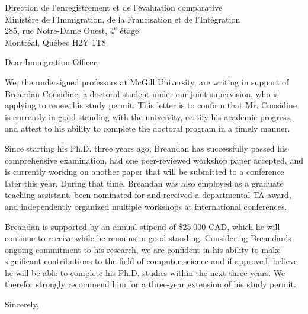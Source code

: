 \documentclass{letter}
\begin{document}
    \begin{letter}{Direction de l'enregistrement et de l'\'evaluation comparative\\
    Minist\`ere de l'Immigration, de la Francisation et de l'Int\'egration\\
    285, rue Notre-Dame Ouest, $4^\text{e}$ \'etage\\
    Montr\'eal, Qu\'ebec H2Y 1T8}
        \opening{Dear Immigration Officer,}
\vspace{10pt}
        We, the undersigned professors at McGill University, are writing in support of Breandan Considine, a doctoral student under our joint supervision, who is applying to renew his study permit. This letter is to confirm that Mr. Considine is currently in good standing with the university, certify his academic progress, and attest to his ability to complete the doctoral program in a timely manner.

        Since starting his Ph.D. three years ago, Breandan has successfully passed his comprehensive examination, had one peer-reviewed workshop paper accepted, and is currently working on another paper that will be submitted to a conference later this year. During that time, Breandan was also employed as a graduate teaching assistant, been nominated for and received a departmental TA award, and independently organized multiple workshops at international conferences.

        Breandan is supported by an annual stipend of \$25,000 CAD, which he will continue to receive while he remains in good standing. Considering Breandan's ongoing commitment to his research, we are confident in his ability to make significant contributions to the field of computer science and if approved, believe he will be able to complete his Ph.D. studies within the next three years. We therefor strongly recommend him for a three-year extension of his study permit.
        \vspace{10pt}

        \closing{Sincerely,\\
        \vspace{30pt}
        }
    \end{letter}
\end{document}
